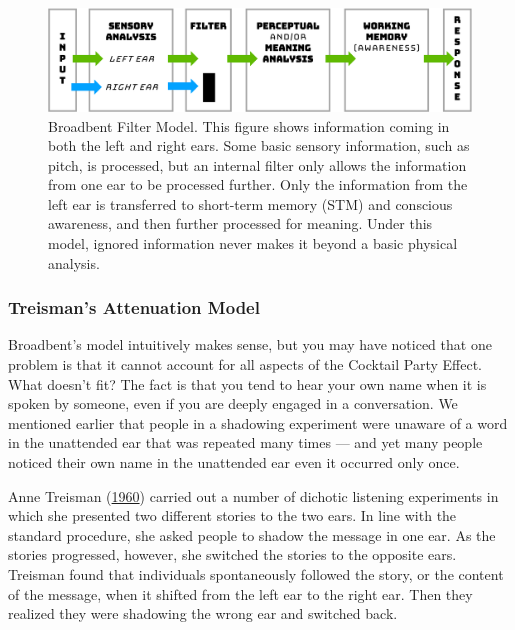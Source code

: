 \documentclass[
]{krantz}
\begin{document}
\begin{figure}

{\centering \includegraphics[width=0.8\linewidth]{images/3_attention/broadbent} 

}

\caption{Broadbent Filter Model. This figure shows information coming in both the left and right ears. Some basic sensory information, such as pitch, is processed, but an internal filter only allows the information from one ear to be processed further. Only the information from the left ear is transferred to short-term memory (STM) and conscious awareness, and then further processed for meaning. Under this model, ignored information never makes it beyond a basic physical analysis.}\label{fig:broadbent}
\end{figure}

\hypertarget{treismans-attenuation-model}{%
\subsubsection*{Treisman's Attenuation Model}\label{treismans-attenuation-model}}


Broadbent's model intuitively makes sense, but you may have noticed that one problem is that it cannot account for all aspects of the Cocktail Party Effect. What doesn't fit? The fact is that you tend to hear your own name when it is spoken by someone, even if you are deeply engaged in a conversation. We mentioned earlier that people in a shadowing experiment were unaware of a word in the unattended ear that was repeated many times --- and yet many people noticed their own name in the unattended ear even it occurred only once.

Anne Treisman (\protect\hyperlink{ref-Treisman1960}{1960}) carried out a number of dichotic listening experiments in which she presented two different stories to the two ears. In line with the standard procedure, she asked people to shadow the message in one ear. As the stories progressed, however, she switched the stories to the opposite ears. Treisman found that individuals spontaneously followed the story, or the content of the message, when it shifted from the left ear to the right ear. Then they realized they were shadowing the wrong ear and switched back.
\end{document}
